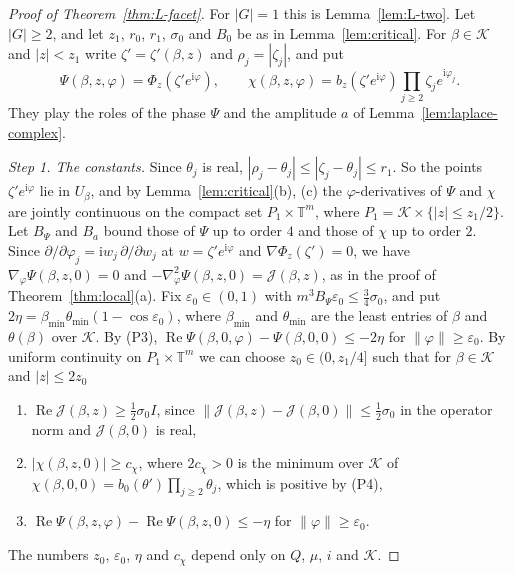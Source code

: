 \begin{proof}[Proof of Theorem~\ref{thm:L-facet}]
For $|G|=1$ this is Lemma~\ref{lem:L-two}. Let $|G|\ge2$, and let $z_1$, $r_0$, $r_1$, $\sigma_0$
and $B_0$ be as in Lemma~\ref{lem:critical}. For $\beta\in\mathcal K$ and $|z|<z_1$ write
$\zeta'=\zeta'(\beta,z)$ and $\rho_j=|\zeta_j|$, and put
\[
\Psi(\beta,z,\varphi)=\Phi_z(\zeta'e^{\mathrm i\varphi}),\qquad
\chi(\beta,z,\varphi)=b_z(\zeta'e^{\mathrm i\varphi})\prod_{j\ge2}\zeta_je^{\mathrm i\varphi_j}.
\]
They play the roles of the phase $\Psi$ and the amplitude $a$ of Lemma~\ref{lem:laplace-complex}.

\emph{Step 1. The constants.} Since $\theta_j$ is real, $|\rho_j-\theta_j|\le|\zeta_j-\theta_j|\le r_1$.
So the points $\zeta'e^{\mathrm i\varphi}$ lie in $U_\beta$, and by Lemma~\ref{lem:critical}(b),
(c) the $\varphi$-derivatives of $\Psi$ and $\chi$ are jointly continuous on the compact set
$P_1\times\mathbb T^m$, where $P_1=\mathcal K\times\{|z|\le z_1/2\}$. Let $B_\Psi$ and $B_a$ bound
those of $\Psi$ up to order $4$ and those of $\chi$ up to order $2$. Since
$\partial/\partial\varphi_j=\mathrm iw_j\,\partial/\partial w_j$ at $w=\zeta'e^{\mathrm i\varphi}$
and $\nabla\Phi_z(\zeta')=0$, we have $\nabla_\varphi\Psi(\beta,z,0)=0$ and
$-\nabla^2_\varphi\Psi(\beta,z,0)=\mathcal J(\beta,z)$, as in the proof of Theorem~\ref{thm:local}(a).
Fix $\varepsilon_0\in(0,1)$ with $m^3B_\Psi\varepsilon_0\le\frac34\sigma_0$, and put
$2\eta=\beta_{\min}\theta_{\min}(1-\cos\varepsilon_0)$, where $\beta_{\min}$ and $\theta_{\min}$ are
the least entries of $\beta$ and $\theta(\beta)$ over $\mathcal K$. By (P3),
$\operatorname{Re}\Psi(\beta,0,\varphi)-\Psi(\beta,0,0)\le-2\eta$ for
$\lVert\varphi\rVert\ge\varepsilon_0$. By uniform continuity on $P_1\times\mathbb T^m$ we can choose
$z_0\in(0,z_1/4]$ such that for $\beta\in\mathcal K$ and $|z|\le2z_0$
\begin{enumerate}[(\roman*)]
\item $\operatorname{Re}\mathcal J(\beta,z)\ge\frac12\sigma_0I$, since
$\lVert\mathcal J(\beta,z)-\mathcal J(\beta,0)\rVert\le\frac12\sigma_0$ in the operator norm and
$\mathcal J(\beta,0)$ is real,
\item $|\chi(\beta,z,0)|\ge c_\chi$, where $2c_\chi>0$ is the minimum over $\mathcal K$ of
$\chi(\beta,0,0)=b_0(\theta')\prod_{j\ge2}\theta_j$, which is positive by (P4),
\item $\operatorname{Re}\Psi(\beta,z,\varphi)-\operatorname{Re}\Psi(\beta,z,0)\le-\eta$ for
$\lVert\varphi\rVert\ge\varepsilon_0$.
\end{enumerate}
The numbers $z_0$, $\varepsilon_0$, $\eta$ and $c_\chi$ depend only on $Q$, $\mu$, $i$ and
$\mathcal K$.


\end{proof}
